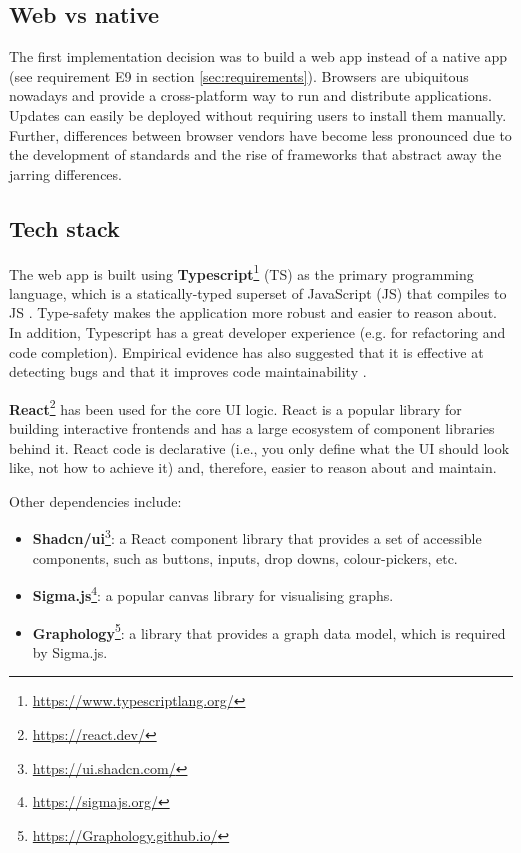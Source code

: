 \documentclass{l4proj}
\begin{document}
\subsection{Web vs native}
The first implementation decision was to build a web app instead of a native app (see requirement E9 in section \ref{sec:requirements}). Browsers are ubiquitous nowadays and provide a cross-platform way to run and distribute applications. Updates can easily be deployed without requiring users to install them manually. Further, differences between browser vendors have become less pronounced due to the development of standards and the rise of frameworks that abstract away the jarring differences.

\subsection{Tech stack}
\label{sec:tech_stack}

The web app is built using \textbf{Typescript}\footnote{\url{https://www.typescriptlang.org/}} (TS) as the primary programming language, which is a statically-typed superset of JavaScript (JS) that compiles to JS \citep{typescript}. Type-safety makes the application more robust and easier to reason about. In addition, Typescript has a great developer experience (e.g. for refactoring and code completion). Empirical evidence has also suggested that it is effective at detecting bugs and that it improves code maintainability \citep{typescript_bugs_paper}.

\textbf{React}\footnote{\url{https://react.dev/}} has been used for the core UI logic. React is a popular library for building interactive frontends and has a large ecosystem of component libraries behind it. React code is declarative (i.e., you only define what the UI should look like, not how to achieve it) and, therefore, easier to reason about and maintain.

Other dependencies include:
\begin{itemize}
    \item \textbf{Shadcn/ui}\footnote{\url{https://ui.shadcn.com/}}: a React component library that provides a set of accessible components, such as buttons, inputs, drop downs, colour-pickers, etc.
    \item \textbf{Sigma.js}\footnote{\url{https://sigmajs.org/}}: a popular canvas library for visualising graphs.
    \item \textbf{Graphology}\footnote{\url{https://Graphology.github.io/}}: a library that provides a graph data model, which is required by Sigma.js.
\end{itemize}
\end{document}
